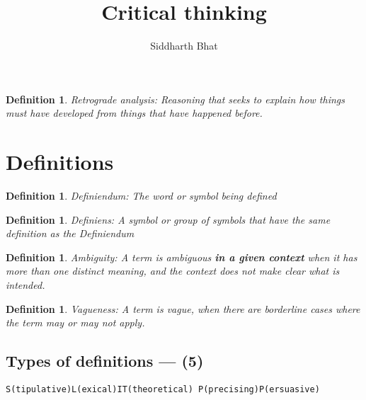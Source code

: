 \documentclass[5pt]{book}
\title{Critical thinking}
\author{Siddharth Bhat}
\date{}
\newtheorem{definition}[theorem]{Definition}
\begin{document}
\maketitle
\tableofcontents

\begin{definition}
    Retrograde analysis: Reasoning that seeks to explain how things
    must have developed from things that have happened before.
\end{definition}

\section{Definitions}
\begin{definition}
    Definiendum: The word or symbol being defined
\end{definition}

\begin{definition}
    Definiens: A symbol or group of symbols that have the same definition
    as the Definiendum
\end{definition}

\begin{definition}
    Ambiguity: A term is ambiguous \textbf{in a given context} when it
    has more than one distinct meaning, and the context does not make clear
    what is intended.
\end{definition}

\begin{definition}
    Vagueness: A term is vague, when there are borderline cases where the
    term may or may not apply.
\end{definition}

\subsection{Types of definitions --- (5)}
\texttt{S(tipulative)L(exical)IT(theoretical) P(precising)P(ersuasive)}
\end{document}

